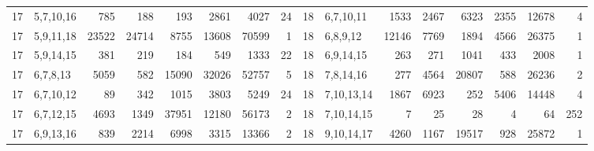 \begin{table}[tp]
\begin{ruledtabular}
\begin{tabular}{rlrrrrrr@{\hspace{2.2em}}rlrrrrrr}
17 & 5,7,10,16 & 785 & 188 & 193 & 2861 & 4027 & 24 & 18 & 6,7,10,11 & 1533 & 2467 & 6323 & 2355 & 12678 & 4 \\
17 & 5,9,11,18 & 23522 & 24714 & 8755 & 13608 & 70599 & 1 & 18 & 6,8,9,12 & 12146 & 7769 & 1894 & 4566 & 26375 & 1 \\
17 & 5,9,14,15 & 381 & 219 & 184 & 549 & 1333 & 22 & 18 & 6,9,14,15 & 263 & 271 & 1041 & 433 & 2008 & 1 \\
17 & 6,7,8,13 & 5059 & 582 & 15090 & 32026 & 52757 & 5 & 18 & 7,8,14,16 & 277 & 4564 & 20807 & 588 & 26236 & 2 \\
17 & 6,7,10,12 & 89 & 342 & 1015 & 3803 & 5249 & 24 & 18 & 7,10,13,14 & 1867 & 6923 & 252 & 5406 & 14448 & 4 \\
17 & 6,7,12,15 & 4693 & 1349 & 37951 & 12180 & 56173 & 2 & 18 & 7,10,14,15 & 7 & 25 & 28 & 4 & 64 & 252 \\
17 & 6,9,13,16 & 839 & 2214 & 6998 & 3315 & 13366 & 2 & 18 & 9,10,14,17 & 4260 & 1167 & 19517 & 928 & 25872 & 1 \\
\end{tabular}
\end{ruledtabular}
\end{table}
